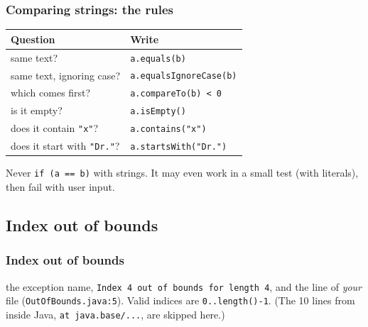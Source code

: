 \documentclass[aspectratio=169,10pt,compress]{beamer}
\begin{document}
\begin{frame}[t,fragile] \frametitle{Comparing strings: the rules}
  \small
  \begin{tabular}{@{}L{0.4\textwidth}L{0.5\textwidth}@{}}
    \toprule
    \textbf{Question}                     & \textbf{Write} \\
    \midrule
    same text?                            & \texttt{a.equals(b)} \\
    same text, ignoring case?             & \texttt{a.equalsIgnoreCase(b)} \\
    which comes first?                    & \texttt{a.compareTo(b) < 0} \\
    is it empty?                          & \texttt{a.isEmpty()} \\
    does it contain \texttt{"x"}?         & \texttt{a.contains("x")} \\
    does it start with \texttt{"Dr."}?    & \texttt{a.startsWith("Dr.")} \\
    \bottomrule
  \end{tabular}

  \vspace{0.8em}
  \begin{alertblock}{Never}
    \texttt{if (a == b)} with strings. It may even work in a small test (with literals), then fail with user input.
  \end{alertblock}
\end{frame}





\subsection[Index]{Index out of bounds}




\begin{frame}[t,fragile] \frametitle{Index out of bounds}

  \small {} the exception name, \texttt{Index 4 out of bounds for length 4}, and the
  line of \emph{your} file (\texttt{OutOfBounds.java:5}). Valid indices are \texttt{0..length()-1}.
  (The 10 lines from inside Java, \texttt{at java.base/...}, are skipped here.)
\end{frame}
\end{document}
